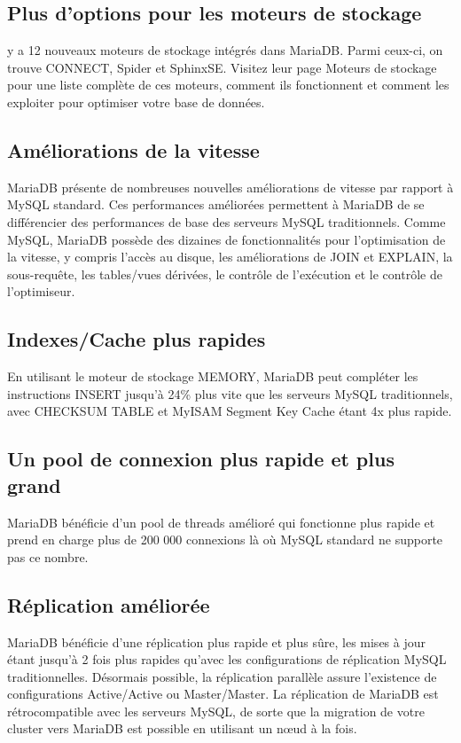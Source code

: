 \subsection{Plus d'options pour les moteurs de stockage}
 y a 12 nouveaux moteurs de stockage intégrés dans MariaDB. Parmi ceux-ci, on trouve CONNECT, Spider et SphinxSE. Visitez leur page Moteurs de stockage pour une liste complète de ces moteurs, comment ils fonctionnent et comment les exploiter pour optimiser votre base de données.\cite{mysql-maria}
\subsection{Améliorations de la vitesse}
MariaDB présente de nombreuses nouvelles améliorations de vitesse par rapport à MySQL standard. Ces performances améliorées permettent à MariaDB de se différencier des performances de base des serveurs MySQL traditionnels. Comme MySQL, MariaDB possède des dizaines de fonctionnalités pour l'optimisation de la vitesse, y compris l'accès au disque, les améliorations de JOIN et EXPLAIN, la sous-requête, les tables/vues dérivées, le contrôle de l'exécution et le contrôle de l'optimiseur.\cite{mysql-maria}
\subsection{Indexes/Cache plus rapides}
En utilisant le moteur de stockage MEMORY, MariaDB peut compléter les instructions INSERT jusqu'à 24\% plus vite que les serveurs MySQL traditionnels, avec CHECKSUM TABLE et MyISAM Segment Key Cache étant 4x plus rapide.\cite{mysql-maria}
\subsection{Un pool de connexion plus rapide et plus grand}
MariaDB bénéficie d'un pool de threads amélioré qui fonctionne plus rapide et prend en charge plus de 200 000 connexions là où MySQL standard ne supporte pas ce nombre.\cite{mysql-maria}
\subsection{Réplication améliorée}
MariaDB bénéficie d'une réplication plus rapide et plus sûre, les mises à jour étant jusqu'à 2 fois plus rapides qu'avec les configurations de réplication MySQL traditionnelles. Désormais possible, la réplication parallèle assure l'existence de configurations Active/Active ou Master/Master. La réplication de MariaDB est rétrocompatible avec les serveurs MySQL, de sorte que la migration de votre cluster vers MariaDB est possible en utilisant un nœud à la fois.\cite{mysql-maria}
